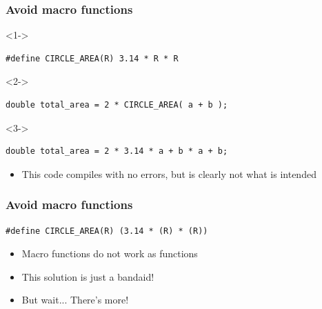 \documentclass[table]{beamer}
\newcounter{rulecount}
\newcommand{\declarerule}{\textbf{\color{themeblue}{Rule \therulecount:}} }
\begin{document}
\begin{frame}[fragile]
    \frametitle{\declarerule Avoid macro functions}
\begin{uncoverenv}<1->
\begin{lstlisting}[title=Given an innocent macro definition]
#define CIRCLE_AREA(R) 3.14 * R * R
\end{lstlisting}
\end{uncoverenv}

\begin{uncoverenv}<2->
\begin{lstlisting}[title=You write]
double total_area = 2 * CIRCLE_AREA( a + b );
\end{lstlisting}
\end{uncoverenv}

\begin{uncoverenv}<3->
\begin{lstlisting}[title=The compiler sees]
double total_area = 2 * 3.14 * a + b * a + b;
\end{lstlisting}
\begin{itemize}
    \item This code compiles with no errors,
        but is clearly not what is intended
\end{itemize}
\end{uncoverenv}

\end{frame}

\begin{frame}[fragile]
    \frametitle{\declarerule Avoid macro functions}
\begin{lstlisting}[title=\textbf{Macro Solution:} Wrap everything in brackets]
#define CIRCLE_AREA(R) (3.14 * (R) * (R))
\end{lstlisting}
\begin{itemize}
    \item<2->Macro functions do not work as functions
    \item<2->This solution is just a bandaid!
    \item<3->But wait... There's more!
\end{itemize}
\end{frame}
\end{document}
